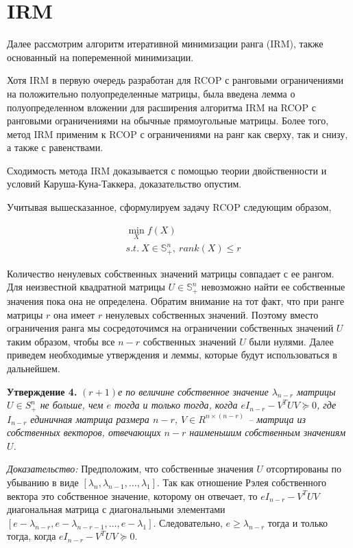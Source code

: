 \documentclass[oneside,final,14pt]{extreport} %
\begin{document}
\section{IRM}
Далее рассмотрим алгоритм итеративной минимизации ранга (IRM), также основанный на попеременной минимизации.

Хотя IRM в первую очередь разработан для RCOP с ранговыми ограничениями на положительно полуопределенные матрицы, была введена лемма о полуопределенном вложении для расширения алгоритма IRM на RCOP с ранговыми ограничениями на обычные прямоугольные матрицы. Более того, метод IRM применим к RCOP с ограничениями на ранг как сверху, так и снизу, а также с равенствами.

Сходимость метода IRM доказывается с помощью теории двойственности и условий Каруша-Куна-Таккера, доказательство опустим.

Учитывая вышесказанное, сформулируем задачу RCOP следующим образом,

\begin{equation}
	\label{new:IRM}
	\begin{aligned}
		&\min_X f(X) \\ &s.t. \  X \in \mathbb{S}_+^n, \ rank(X) \le r
	\end{aligned}
\end{equation}

Количество ненулевых собственных значений матрицы совпадает с ее рангом. Для неизвестной квадратной матрицы $U \in \mathbb S_+^n$ невозможно найти ее собственные значения пока она не определена. Обратим внимание на тот факт, что при ранге матрицы $r$ она имеет $r$ ненулевых собственных значений. Поэтому вместо ограничения ранга мы сосредоточимся на ограничении собственных значений $U$ таким образом, чтобы все $n - r$ собственных значений $U$ были нулями. Далее приведем необходимые утверждения и леммы, которые будут использоваться в дальнейшем.

\textbf{Утверждение 4.}
{\it $(r+1)$е по величине собственное значение $\lambda_{n-r}$ матрицы $U \in S_+^n$ не больше, чем $e$ тогда и только тогда, когда $eI_{n-r} - V^T U V \succeq 0$, где $I_{n-r}$ единичная матрица размера $n - r$, $V \in R^{n \times (n-r)}$ -- матрица из собственных векторов, отвечающих $n - r$ наименьшим собственным значениям $U$.
}

\textit{Доказательство:} Предположим, что собственные значения $U$ отсортированы по убыванию в виде $[ \lambda_n, \lambda_{n-1}, \ldots , \lambda_1 ]$. Так как отношение Рэлея собственного вектора это собственное значение, которому он отвечает, то $eI_{n-r} - V^T U V$ диагональная матрица с диагональными элементами $[e-\lambda_{n-r}, e-\lambda_{n-r-1}, \ldots, e-\lambda_1 ]$. Следовательно, $e \ge \lambda_{n-r}$ тогда и только тогда, когда $eI_{n-r} - V^TUV \succeq 0$.
\end{document}
